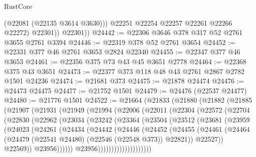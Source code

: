 \begin{lexlean}{RustCore}
\begin{coremodule}
                (@22081 (@22135 @3614 @3630)))
              @22251
              @22254
              @22257
              @22261
              @22266
              @22272)
            @22301))
        @22301))
@24442 := @22306 @3646 @378 @317 @52 @2761 @3655 @2761 @3394
@24446 := @22319 @378 @52 @2761 @3654
@24452 := @22331 @377 @46 @2761 @3653 @2824 @22340
@24455 := @22347 @377 @46 @3653
@24461 := @22356 @375 @73 @43 @45 @3651 @2778
@24464 := @22368 @375 @43 @3651
@24473 := @22377 @373 @118 @48 @43 @2761 @2867 @2782 @1501 @24236
@24474 := @21681 @373
@24475 := @21878 @24474
@24476 := @24473 @24475
@24477 := @21752 @1501
@24479 := @24476 (@22537 @24477)
@24480 := @21776 @1501
@24522 := @21664
    (@21833
      (@21880
        (@21882
          (@21885
            (@21907
              (@21931
                (@21949
                  (@21994
                    (@22006
                      (@22011
                        (@22304
                          (@22572
                            (@22704
                              (@22830
                                (@22962
                                  (@23034
                                    (@23242
                                      (@23364
                                        (@23504
                                          (@23512
                                            (@23681
                                              (@23959
                                                (@24023
                                                  (@24261
                                                    (@24434
                                                      (@24442
                                                        (@24446
                                                          (@24452
                                                            (@24455
                                                              (@24461
                                                                (@24464
                                                                  (@24479
                                                                    (@22541 @24480)
                                                                    (@22546 (@22548 @373))
                                                                    @22821))
                                                                @22527))
                                                            @22569))
                                                        @23956))))))
                                            @23956))))))))))))))))))))

\end{coremodule}
\end{lexlean}
